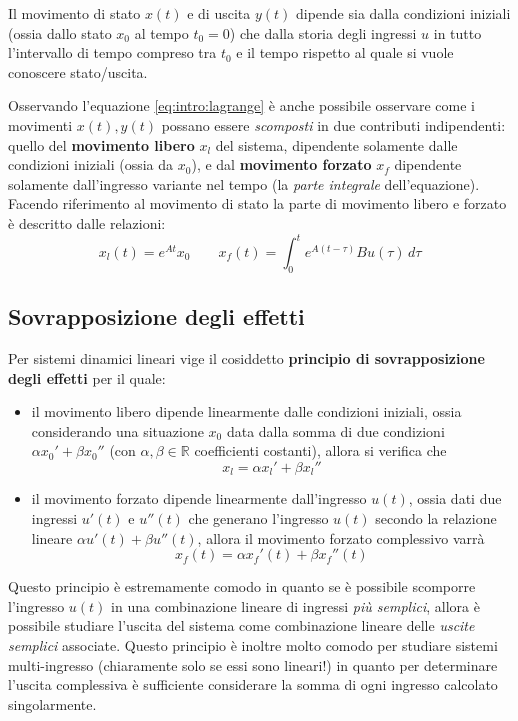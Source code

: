 		\begin{osservazione}
			Il movimento di stato $x(t)$ e di uscita $y(t)$ dipende sia dalla condizioni iniziali (ossia dallo stato $x_0$ al tempo $t_0 = 0$) che dalla storia degli ingressi $u$ in tutto l'intervallo di tempo compreso tra $t_0$ e il tempo rispetto al quale si vuole conoscere stato/uscita.
		\end{osservazione}
	
		Osservando l'equazione \ref{eq:intro:lagrange} è anche possibile osservare come i movimenti $x(t),y(t)$ possano essere \textit{scomposti} in due contributi indipendenti: quello del \textbf{movimento libero} $x_l$ del sistema, dipendente solamente dalle condizioni iniziali (ossia da $x_0$), e dal \textbf{movimento forzato} $x_f$ dipendente solamente dall'ingresso variante nel tempo (la \textit{parte integrale} dell'equazione). Facendo riferimento al movimento di stato la parte di movimento libero e forzato è descritto dalle relazioni:
		\[ x_l(t) = e^{At} x_0 \qquad x_f(t) = \int_0^t e^{A(t-\tau)} B u(\tau)\, d\tau  \]
		
	\subsection{Sovrapposizione degli effetti}
		\begin{concetto}
			Per sistemi dinamici lineari vige il cosiddetto \textbf{principio di sovrapposizione degli effetti} per il quale:
			\begin{itemize}
				\item il movimento libero dipende linearmente dalle condizioni iniziali, ossia considerando una situazione $x_0$ data dalla somma di due condizioni $\alpha x_0'+\beta x_0''$ (con $\alpha,\beta\in \mathds R$ coefficienti costanti), allora si verifica che
				\[ x_l = \alpha x_l' + \beta x_l'' \]
				
				\item il movimento forzato dipende linearmente dall'ingresso $u(t)$, ossia dati due ingressi $u'(t)$ e $u''(t)$ che generano l'ingresso $u(t)$ secondo la relazione lineare $\alpha u'(t) + \beta u''(t)$, allora il movimento forzato complessivo varrà
				\[ x_f(t) = \alpha x_f'(t) + \beta x_f''(t) \]				
			\end{itemize}
		\end{concetto}
		Questo principio è estremamente comodo in quanto se è possibile scomporre l'ingresso $u(t)$ in una combinazione lineare di ingressi \textit{più semplici}, allora è possibile studiare l'uscita del sistema come combinazione lineare delle \textit{uscite semplici} associate. Questo principio è inoltre molto comodo per studiare sistemi multi-ingresso (chiaramente solo se essi sono lineari!) in quanto per determinare l'uscita complessiva è sufficiente considerare la somma di ogni ingresso calcolato singolarmente.		
		
